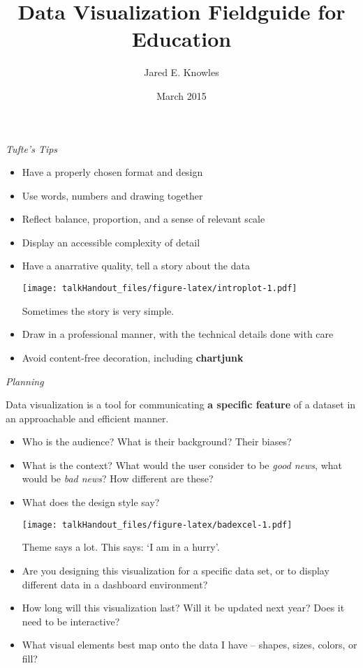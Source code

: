 \documentclass{tufte-handout}
\title{Data Visualization Fieldguide for Education}
\author{Jared E. Knowles}
\date{March 2015}
\begin{document}
\maketitle



\noindent \emph{Tufte's Tips}

\begin{itemize}
\itemsep1pt\parskip0pt
\item
  Have a properly chosen format and design
\item
  Use words, numbers and drawing together
\item
  Reflect balance, proportion, and a sense of relevant scale
\item
  Display an accessible complexity of detail
\item
  Have a anarrative quality, tell a story about the data

  \begin{marginfigure}
   \texttt{[image: talkHandout\_files/figure-latex/introplot-1.pdf]}
  \caption{Sometimes the story is very simple.}
  \end{marginfigure}
\item
  Draw in a professional manner, with the technical details done with
  care
\item
  Avoid content-free decoration, including \textbf{chartjunk}
\end{itemize}

\noindent \emph{Planning}

\noindent Data visualization is a tool for communicating \textbf{a
specific feature} of a dataset in an approachable and efficient
manner.

\begin{itemize}
\itemsep1pt\parskip0pt
\item
  Who is the audience? What is their background? Their biases?
\item
  What is the context? What would the user consider to be \emph{good
  news}, what would be \emph{bad news}? How different are these?
\item
  What does the design style say?

  \begin{marginfigure}
   \texttt{[image: talkHandout\_files/figure-latex/badexcel-1.pdf]}
  \caption{Theme says a lot. This says: `I am in a hurry'.}
  \end{marginfigure}
\item
  Are you designing this visualization for a specific data set, or to
  display different data in a dashboard environment?
\item
  How long will this visualization last? Will it be updated next year?
  Does it need to be interactive?
\item
  What visual elements best map onto the data I have -- shapes, sizes,
  colors, or fill?
\end{itemize}
\end{document}
